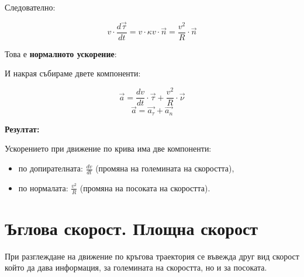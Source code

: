 \documentclass{report}
\begin{document}
Следователно:

\[
v \cdot \frac{d\vec{\tau}}{dt} = v \cdot \kappa v \cdot \vec{n} = \frac{v^2}{R} \cdot \vec{n}
\]

Това е \textbf{нормалното ускорение}:

\cor{}{\[
\vec{a}_n = \frac{v^2}{R} \cdot \vec{n}
\]}

И накрая събираме двете компоненти:

\[
\vec{a} = \frac{dv}{dt} \cdot \vec{\tau} + \frac{v^2}{R} \cdot \vec{\nu}
\]
\[
\vec{a}=\vec{a_\tau}+\vec{a_n}
\]

\medskip

\textbf{Резултат:}

Ускорението при движение по крива има две компоненти:
\begin{itemize}
    \item по допирателната: \(\frac{dv}{dt}\) (промяна на големината на скоростта),
    \item по нормалата: \(\frac{v^2}{R}\) (промяна на посоката на скоростта).
\end{itemize}
\section{Ъглова скорост. Площна скорост}
При разглеждане на движение по кръгова траектория се въвежда друг вид скорост който да дава информация, за големината на скоростта, но и за посоката.
\end{document}

